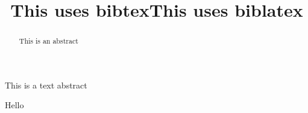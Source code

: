 \documentclass[journal=cic,version=final]{iacrj}
\title{This uses bibtex}
\title{This uses biblatex}
\begin{document}
\maketitle
\begin{abstract}
This is an abstract
\end{abstract}
\begin{textabstract}
This is a text abstract
\end{textabstract}

Hello \cite{DHMR08}
\cite{hand}
\cite{website}
\cite{turing}
\cite{algorand}
\cite{sealcrypto}
\cite{ong}
\cite{art1}
\cite{EPRINT:KleOneAki23}
\cite{art2}
\cite{DHMR08}
\ifusebibtex
 
\else
 \printbibliography
\fi
\end{document}
